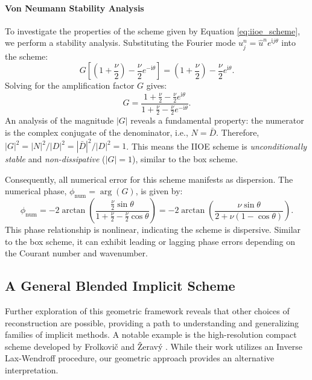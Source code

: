 \paragraph{Von Neumann Stability Analysis}
To investigate the properties of the scheme given by Equation \eqref{eq:iioe_scheme}, we perform a stability analysis. Substituting the Fourier mode \( u_j^n = \hat{u}^n e^{\mathrm{i} j \theta} \) into the scheme:
\[
    G \left[ \left(1+\frac{\nu}{2}\right) - \frac{\nu}{2}e^{-\mathrm{i}\theta} \right] = \left(1+\frac{\nu}{2}\right) - \frac{\nu}{2}e^{\mathrm{i}\theta}.
\]
Solving for the amplification factor \(G\) gives:
\begin{equation}
    G = \frac{1+\frac{\nu}{2} - \frac{\nu}{2}e^{\mathrm{i}\theta}}{1+\frac{\nu}{2} - \frac{\nu}{2}e^{-\mathrm{i}\theta}}.
    \label{eq:iioe_g}
\end{equation}
An analysis of the magnitude \(|G|\) reveals a fundamental property: the numerator is the complex conjugate of the denominator, i.e., \(N = \bar{D}\).
Therefore, \(|G|^2 = |N|^2 / |D|^2 = |\bar{D}|^2 / |D|^2 = 1\).
This means the IIOE scheme is \textit{unconditionally stable} and \textit{non-dissipative} (\(|G|=1\)), similar to the box scheme.

Consequently, all numerical error for this scheme manifests as dispersion. The numerical phase, \(\phi_{\text{num}} = \arg(G)\), is given by:
\begin{equation}
    \phi_{\text{num}} = -2\arctan\left(\frac{\frac{\nu}{2}\sin\theta}{1+\frac{\nu}{2} - \frac{\nu}{2}\cos\theta}\right) = -2\arctan\left(\frac{\nu\sin\theta}{2+\nu(1-\cos\theta)}\right).
    \label{eq:iioe_phase}
\end{equation}
This phase relationship is nonlinear, indicating the scheme is dispersive. Similar to the box scheme, it can exhibit leading or lagging phase errors depending on the Courant number and wavenumber.

\subsection{A General Blended Implicit Scheme}

Further exploration of this geometric framework reveals that other choices of reconstruction are possible, providing a path to understanding and generalizing families of implicit methods. A notable example is the high-resolution compact scheme developed by Frolkovi\v{c} and \v{Z}erav\'{y} \cite{frolkovic2023high}. While their work utilizes an Inverse Lax-Wendroff procedure, our geometric approach provides an alternative interpretation.

